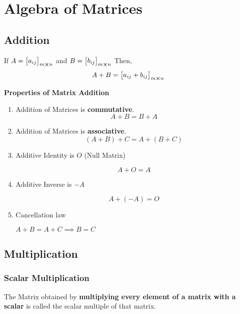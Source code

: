 \documentclass{article}
\begin{document}
\section{Algebra of Matrices}

\subsection{Addition}
If $A={\begin{bmatrix}
        a_{ij}
    \end{bmatrix}}_{m \cross n} $ and $B={\begin{bmatrix}
        b_{ij}
    \end{bmatrix}}_{m \cross n} $
\newline \newline
Then, $$A+B= {\begin{bmatrix}
        a_{ij}+b_{ij}
    \end{bmatrix}}_{m \cross n} $$

\textbf{Properties of Matrix Addition}

\begin{enumerate}[1.]
    \item Addition of Matrices is \textbf{commutative}.
          $$A+B= B+A$$

    \item Addition of Matrices is \textbf{associative}.
          $$(A+B)+C=A+(B+C)$$

    \item Additive Identity is $O$ (Null Matrix)

          $$A+O=A$$

    \item Additive Inverse is $-A$

          $$A+ (-A)= O$$

    \item Cancellation law

          $A+B=A+C \implies B=C$
\end{enumerate}
\subsection{Multiplication}

\subsubsection{Scalar Multiplication}
The  Matrix obtained by \textbf{multiplying every element of a matrix with a scalar} is called the scalar multiple of that matrix.
\end{document}
